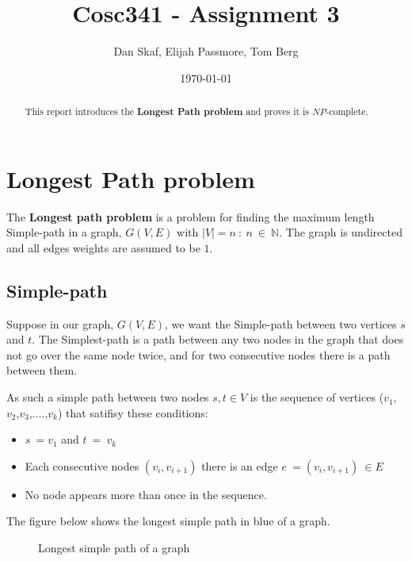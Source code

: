 \documentclass[a4paper,11pt]{article}
\title{Cosc341 - Assignment 3}
\author{Dan Skaf, Elijah Passmore, Tom Berg}
\date{\today}
\begin{document}
\maketitle

\begin{abstract}
This report introduces the \textbf{Longest Path problem} and proves it is $NP$-complete.
\end{abstract}

\section{Longest Path problem}
The \textbf{Longest path problem} is a problem for finding the maximum length 
Simple-path in a graph, $G(V,E)$ with $\left|V\right|=n\::\:n\:\in\:\mathbb{N}$.
The graph is undirected and all edges weights are assumed to be $1$.

    \subsection{Simple-path} 
    Suppose in our graph, $G(V,E)$, we want the Simple-path between two vertices 
    $s$ and $t$. The Simplest-path is a path between any two nodes in the graph 
    that does not go over the same node twice, and for two consecutive nodes 
    there is a path between them.

    As such a simple path between two nodes $s,t\in V$ is the sequence of 
    vertices ($v_1$,$v_2$,$v_3$,$....$,$v_k$) that satifisy these conditions:
    \begin{itemize}
        \item $s\:=v_1$ and $t\:=\:v_k$
        \item Each consecutive nodes $\left(v_i,v_{i+1}\right)$ there is an 
        edge $e\:=\left(v_i,v_{i+1}\right)\:\in E$
        \item No node appears more than once in the sequence.
    \end{itemize}
The figure below shows the longest simple path in blue of a graph.
\begin{figure}[!h]
    \centering {}
    \caption{Longest simple path of a graph}
\end{figure}
\end{document}
